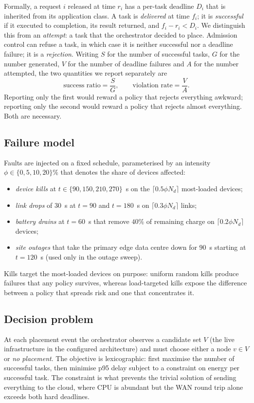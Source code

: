 \documentclass[journal,10pt]{IEEEtran}
\begin{document}
Formally, a request $i$ released at time $r_i$ has a per-task deadline
$D_i$ that is inherited from its application class. A task is
\emph{delivered} at time $f_i$; it is \emph{successful} if it executed to
completion, its result returned, and $f_i-r_i<D_i$. We distinguish this from
an \emph{attempt}: a task that the orchestrator decided to place. Admission
control can refuse a task, in which case it is neither successful nor a
deadline failure; it is a \emph{rejection}. Writing $S$ for the number of
successful tasks, $G$ for the number generated, $V$ for the number of deadline
failures and $A$ for the number attempted, the two quantities we report
separately are
\begin{equation}
\text{success ratio}=\frac{S}{G},
\qquad
\text{violation rate}=\frac{V}{A}.
\label{eq:metrics}
\end{equation}
Reporting only the first would reward a policy that rejects everything
awkward; reporting only the second would reward a policy that rejects almost
everything. Both are necessary.

\subsection{Failure model}
Faults are injected on a fixed schedule, parameterised by an intensity
$\phi\in\{0,5,10,20\}\%$ that denotes the share of devices affected:
\begin{itemize}
\item \emph{device kills} at $t\in\{90,150,210,270\}$~s on the
  $\lceil 0.5\phi N_d\rceil$ most-loaded devices;
\item \emph{link drops} of $30$~s at $t=90$ and $t=180$~s on
  $\lceil 0.3\phi N_d\rceil$ links;
\item \emph{battery drains} at $t=60$~s that remove $40\%$ of remaining
  charge on $\lceil 0.2\phi N_d\rceil$ devices;
\item \emph{site outages} that take the primary edge data centre down for
  $90$~s starting at $t=120$~s (used only in the outage sweep).
\end{itemize}
Kills target the most-loaded devices on purpose: uniform random kills produce
failures that any policy survives, whereas load-targeted kills expose the
difference between a policy that spreads risk and one that concentrates it.

\subsection{Decision problem}
At each placement event the orchestrator observes a candidate set $V$ (the
live infrastructure in the configured architecture) and must choose either a
node $v\in V$ or \emph{no placement}. The objective is lexicographic: first
maximise the number of successful tasks, then minimise p95 delay subject to a
constraint on energy per successful task. The constraint is what prevents the
trivial solution of sending everything to the cloud, where CPU is abundant but
the WAN round trip alone exceeds both hard deadlines.
\end{document}

